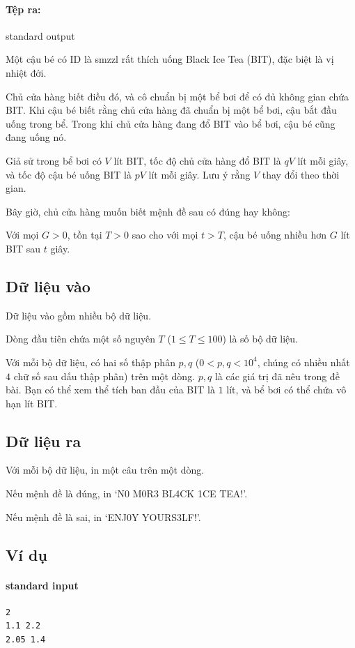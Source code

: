 \documentclass[11pt]{article}
\begin{document}
\paragraph{Tệp ra:} standard output

Một cậu bé có ID là smzzl rất thích uống Black Ice Tea (BIT), đặc biệt là vị
nhiệt đới.

Chủ cửa hàng biết điều đó, và cô chuẩn bị một bể bơi để có đủ không gian chứa
BIT. Khi cậu bé biết rằng chủ cửa hàng đã chuẩn bị một bể bơi, cậu bắt đầu
uống trong bể. Trong khi chủ cửa hàng đang đổ BIT vào bể bơi, cậu bé cũng
đang uống nó.

Giả sử trong bể bơi có \(V\) lít BIT, tốc độ chủ cửa hàng đổ BIT là \(qV\)
lít mỗi giây, và tốc độ cậu bé uống BIT là \(pV\) lít mỗi giây. Lưu ý rằng
\(V\) thay đổi theo thời gian.

Bây giờ, chủ cửa hàng muốn biết mệnh đề sau có đúng hay không:

Với mọi \(G>0\), tồn tại \(T>0\) sao cho với mọi \(t>T\), cậu bé uống nhiều
hơn \(G\) lít BIT sau \(t\) giây.

\subsection*{Dữ liệu vào}

Dữ liệu vào gồm nhiều bộ dữ liệu.

Dòng đầu tiên chứa một số nguyên \(T\) (\(1\le T\le 100\)) là số bộ dữ liệu.

Với mỗi bộ dữ liệu, có hai số thập phân \(p,q\)
(\(0<p,q<10^4\), chúng có nhiều nhất \(4\) chữ số sau dấu thập phân) trên một
dòng. \(p,q\) là các giá trị đã nêu trong đề bài. Bạn có thể xem thể tích ban
đầu của BIT là \(1\) lít, và bể bơi có thể chứa vô hạn lít BIT.

\subsection*{Dữ liệu ra}

Với mỗi bộ dữ liệu, in một câu trên một dòng.

Nếu mệnh đề là đúng, in `N0 M0R3 BL4CK 1CE TEA!'.

Nếu mệnh đề là sai, in `ENJ0Y YOURS3LF!'.

\subsection*{Ví dụ}

\paragraph{standard input}
\begin{verbatim}
2
1.1 2.2
2.05 1.4
\end{verbatim}
\end{document}
